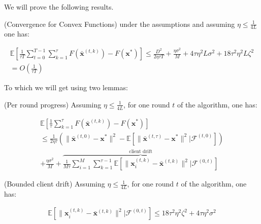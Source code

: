 We will prove the following results. 


\begin{theorem}
    (Convergence for Convex Functions) under the assumptions and assuming $\eta \leq \frac{1}{4L}$ one has: 

    \begin{equation}
        \begin{aligned}
            \mathbb{E} \left[ \frac{1}{\tau T} \sum_{t=0}^{T-1}\sum_{k=1}^{\tau} F(\bar{\bm{x}}^{(t,k)}) - F(\bm{x}^*)\right] 
            \leq \frac{D^2}{2 \eta \tau T} + \frac{\eta \sigma^2}{M} + 4 \tau \eta^2 L \sigma^2 + 18 \tau^2 \eta^2 L \zeta^2 \\
            = O\left( \frac{1}{\tau T} \right)
        \end{aligned}
        \label{eq:convergence}
    \end{equation}
    \label{convergence}
\end{theorem}

\noindent
To which we will get using two lemmas:

\begin{lemma}
    (Per round progress) Assuming $\eta \leq \frac{1}{4L}$, for one round $t$ of the algorithm, one has: 
    
    \begin{equation}
        \begin{aligned}
            \mathbb{E} \left[ \frac{1}{\tau} \sum_{k=1}^{\tau} F(\bar{\bm{x}}^{(t,k)}) - F(\bm{x}^*)\right]  \\
            \leq \frac{1}{2 \eta \tau} \left( \| \bar{\bm{x}}^{(t,0)} -\bm{x}^{*} \|^2 - \mathbb{E}\left[  \| \bar{\bm{x}}^{(t,\tau)} -\bm{x}^{*} \|^2  | \mathcal{F}^{(t,0)}\right]  \right)\\
            + \frac{\eta \sigma^2}{M} + \overbrace{\frac{1}{M \tau} \sum^M_{i=1} \sum^{\tau-1}_{k=1} \mathbb{E} \left[ \| \bm{x}_i^{(t,k)} -\bar{\bm{x}}^{(t,k)} \|^2 | \mathcal{F}^{(0,t)}\right]}^\text{client drift}
        \end{aligned}
        \label{eq:per_round_progress}
    \end{equation}
    \label{per_round_progress}
\end{lemma}

\begin{lemma}
    (Bounded client drift) Assuming $\eta \leq \frac{1}{4L}$, for one round $t$ of the algorithm, one has: 
    
    \begin{equation}
        \begin{aligned}
            \mathbb{E} \left[ \| \bm{x}_i^{(t,k)} -\bar{\bm{x}}^{(t,k)} \|^2 | \mathcal{F}^{(0,t)}\right]
            \leq 18\tau^2 \eta^2 \zeta^2 + 4 \tau \eta^2 \sigma^2
        \end{aligned}
        \label{eq:client_drift}
    \end{equation}
    \label{client_drift}
\end{lemma}

